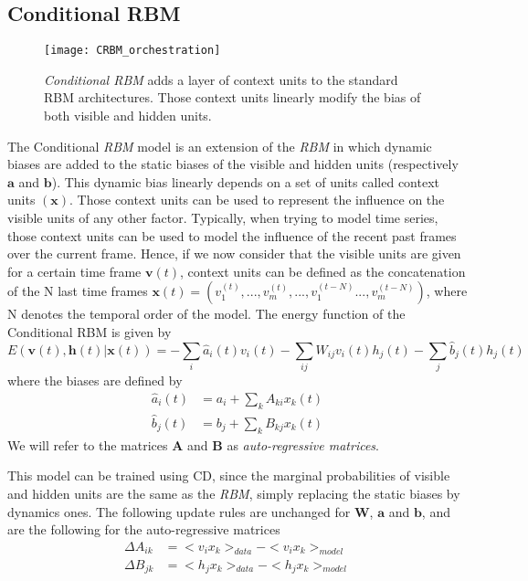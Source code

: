 \documentclass[letterpaper]{article}
\begin{document}
\subsection{Conditional RBM}
\begin{figure}
\centering
\texttt{[image: CRBM\_orchestration]}
\caption{\textit{Conditional RBM} adds a layer of context units to the standard RBM architectures. Those context units linearly modify the bias of both visible and hidden units.}
\end{figure}
The Conditional \textit{RBM} model \cite{taylor2009composable} is an extension of the \textit{RBM} in which dynamic biases are added to the static biases of the visible and hidden units (respectively $\bm{a}$ and $\bm{b}$). This dynamic bias linearly depends on a set of units called context units $(\bm{x})$. Those context units can be used to represent the influence on the visible units of any other factor. Typically, when trying to model time series, those context units can be used to model the influence of the recent past frames over the current frame. Hence, if we now consider that the visible units are given for a certain time frame $\bm{v}(t)$, context units can be defined as the concatenation of the N last time frames $\bm{x}(t) = \left( v_{1}^{(t)} , ... , v_{m}^{(t)}, ... , v_{1}^{(t-N)} ... , v_{m}^{(t-N)} \right)$, where N denotes the temporal order of the model.
The energy function of the Conditional RBM is given by
\begin{equation}
\label{eq:energy_CRBM}
E(\bm{v}(t),\bm{h}(t)|\bm{x}(t)) = - \sum_{i} \hat{a}_{i}(t)v_{i}(t) - \sum_{ij}W_{ij}v_{i}(t)h_{j}(t) - \sum_{j} \hat{b}_{j}(t)h_{j}(t)
\end{equation}
where the biases are defined by 
\begin{align*}
\hat{a}_{i}(t) &= a_{i} + \sum_{k}A_{ki}x_{k}(t)\\
\hat{b}_{j}(t) &= b_{j} + \sum_{k}B_{kj}x_{k}(t)
\end{align*}
We will refer to the matrices $\bm{A}$ and $\bm{B}$ as \textit{auto-regressive matrices}.

This model can be trained using CD, since the marginal probabilities of visible and hidden units are the same as the \textit{RBM}, simply replacing the static biases by dynamics ones.
The following update rules are unchanged for $\bm{W}$, $\bm{a}$ and $\bm{b}$, and are the following for the auto-regressive matrices
\begin{align}
\Delta A_{ik} 	&=<v_{i}x_{k} >_{data} - <v_{i}x_{k} >_{model}\\
\Delta B_{jk} 	&= <h_{j}x_{k} >_{data} - <h_{j}x_{k} >_{model}\\
\end{align}
\end{document}
